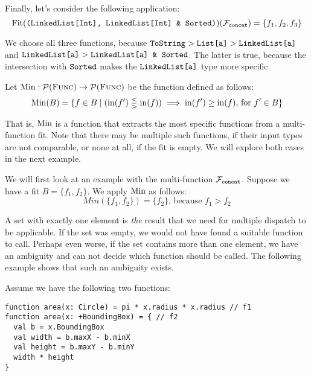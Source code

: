 \medskip
	
\noindent Finally, let's consider the following application:
\begin{equation*}
	\operatorname{Fit}(\texttt{(LinkedList[Int], LinkedList[Int] \& Sorted)})(\mathcal{F}_{\text{\texttt{concat}}}) = \{ f_1, f_2, f_3 \}
\end{equation*}
	
\noindent We choose all three functions, because $\texttt{ToString} > \texttt{List[a]} > \texttt{LinkedList[a]}$ and $ \texttt{LinkedList[a]} > \texttt{LinkedList[a] \& Sorted}$. The latter is true, because the intersection with $\texttt{Sorted}$ makes the $\texttt{LinkedList[a]}$ type more specific.


\begin{definition} \label{def:mfmin}
	Let $\operatorname{Min} : \mathcal{P}(\textsc{Func}) \rightarrow \mathcal{P}(\textsc{Func})$ be the function defined as follows:
	\begin{align*}
		\operatorname{Min}(B) = \{ f \in B \mid (\operatorname{in}(f') \lesseqgtr \operatorname{in}(f)) \implies \operatorname{in}(f') \geq \operatorname{in}(f) \text{, for } f' \in B \}
	\end{align*}
\end{definition}

\noindent That is, $\operatorname{Min}$ is a function that extracts the most specific functions from a multi-function fit. Note that there may be multiple such functions, if their input types are not comparable, or none at all, if the fit is empty. We will explore both cases in the next example.

We will first look at an example with the multi-function $\mathcal{F}_{\text{\texttt{concat}}}$. Suppose we have a fit $B = \{ f_1, f_2 \}$. We apply $\operatorname{Min}$ as follows:
\begin{equation*}
	Min(\{ f_1, f_2 \}) = \{ f_2 \} \text{, because } f_1 > f_2
\end{equation*}
	
\noindent A set with exactly one element is \textit{the} result that we need for multiple dispatch to be applicable. If the set was empty, we would not have found a suitable function to call. Perhaps even worse, if the set contains more than one element, we have an ambiguity and can not decide which function should be called. The following example shows that such an ambiguity exists.

\medskip
	
\noindent Assume we have the following two functions:
\begin{lstlisting}
function area(x: Circle) = pi * x.radius * x.radius // f1
function area(x: +BoundingBox) = { // f2
  val b = x.BoundingBox
  val width = b.maxX - b.minX
  val height = b.maxY - b.minY
  width * height
} 
\end{lstlisting}
	
